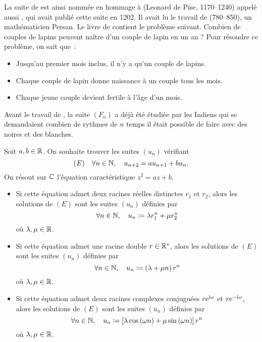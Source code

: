 \documentclass{magnolia}
\begin{document}
\begin{remarqueUnique}
\remarque La suite de  est ainsi nommée en hommage à  (Leonard de Pise, 1170--1240) appelé aussi , qui avait publié cette suite en 1202. Il avait lu le travail de  (780--850), un mathématicien Persan. Le livre de  contient le problème suivant. Combien de couples de lapins peuvent naître d'un couple de lapin en un an ? Pour résoudre ce problème, on sait que~:
\begin{itemize}
\item Jusqu'au premier mois inclus, il n'y a qu'un couple de lapins.
\item Chaque couple de lapin donne naissance à un couple tous les mois.
\item Chaque jeune couple devient fertile à l'âge d'un mois.
\end{itemize}
Avant le travail de , la suite $(F_n)$ a déjà été étudiée par les Indiens qui se demandaient combien de rythmes de $n$ temps il était possible de faire avec des noires et des blanches.
\end{remarqueUnique}

\begin{proposition}[utile=-3]
Soit $a,b\in\mathbb{R}$. On souhaite trouver les suites $(u_n)$ vérifiant
\[(E) \quad \forall n\in\mathbb{N} ,\quad u_{n+2}=au_{n+1}+b u_n.\]
On résout sur $\mathbb{C}$ l'équation caractéristique $z^2=az+b$.
\begin{itemize}
\item Si cette équation admet deux racines réelles distinctes $r_1$ et $r_2$,
  alors les solutions de $(E)$ sont les suites $(u_n)$ définies par
  \[\forall n\in\mathbb{N} ,\quad u_n\coloneqq\lambda r_1^n +\mu r_2^n\]
  où $\lambda,\mu\in\mathbb{R}$.
\item Si cette équation admet une racine double $r\in{\mathbb{R}^*}$,
  alors les solutions de $(E)$ sont les suites $(u_n)$ définies par
  \[\forall n\in\mathbb{N} ,\quad u_n\coloneqq\left(\lambda +\mu n\right)r^n\]
  où $\lambda,\mu\in\mathbb{R}$.
\item Si cette équation admet deux racines complexes conjuguées $r{\rm e}^{{\rm i}\omega}$ et
  $r{\rm e}^{-{\rm i}\omega}$, 
  alors les solutions de $(E)$ sont les suites $(u_n)$ définies par
  \[\forall n\in\mathbb{N} ,\quad u_n\coloneqq\left[\lambda \cos\left(\omega n\right)+\mu \sin\left(\omega n\right)\right]
    r^n\]
  où $\lambda,\mu\in\mathbb{R}$.
\end{itemize}
\end{proposition}
\end{document}
